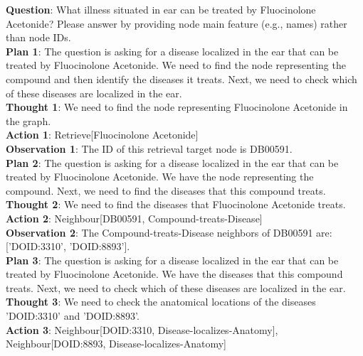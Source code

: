 \documentclass[11pt]{article}
\begin{document}
\begin{tcolorbox}[colback=white!10!white, colframe=blue!30!black, title=Wrong Case (Biomedical), boxrule=1pt, fontupper={\fontsize{7pt}{9pt}\selectfont}]
\justifying
\noindent
\raggedright
\textbf{Question}: What illness situated in ear can be treated by Fluocinolone Acetonide? Please answer by providing node main feature (e.g., names) rather than node IDs. \\
\textbf{Plan 1}: The question is asking for a disease localized in the ear that can be treated by Fluocinolone Acetonide. We need to find the node representing the compound and then identify the diseases it treats. Next, we need to check which of these diseases are localized in the ear.\\
\textbf{Thought 1}: We need to find the node representing Fluocinolone Acetonide in the graph.\\
\textbf{Action 1}: Retrieve[Fluocinolone Acetonide]\\
\textbf{Observation 1}: The ID of this retrieval target node is DB00591. \\
\textbf{Plan 2}: The question is asking for a disease localized in the ear that can be treated by Fluocinolone Acetonide. We have the node representing the compound. Next, we need to find the diseases that this compound treats.\\
\textbf{Thought 2}: We need to find the diseases that Fluocinolone Acetonide treats.\\
\textbf{Action 2}: Neighbour[DB00591, Compound-treats-Disease]\\
\textbf{Observation 2}: The Compound-treats-Disease neighbors of DB00591 are: ['DOID:3310', 'DOID:8893']. \\
\textbf{Plan 3}: The question is asking for a disease localized in the ear that can be treated by Fluocinolone Acetonide. We have the diseases that this compound treats. Next, we need to check which of these diseases are localized in the ear.\\
\textbf{Thought 3}: We need to check the anatomical locations of the diseases 'DOID:3310' and 'DOID:8893'.\\
\textbf{Action 3}: Neighbour[DOID:3310, Disease-localizes-Anatomy], Neighbour[DOID:8893, Disease-localizes-Anatomy]\\
\end{tcolorbox}
\end{document}
